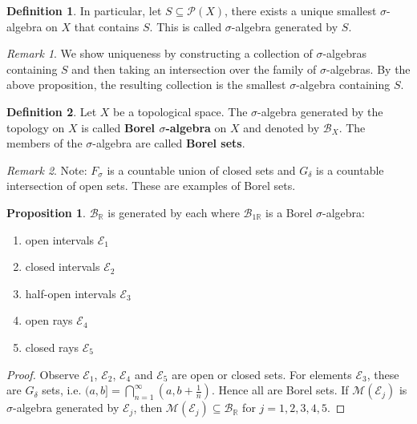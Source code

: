 \documentclass[11pt]{article}
\theoremstyle{definition}
\newtheorem{definition}{Definition}[section]
\newtheorem{proposition}{Proposition}[section]
\theoremstyle{remark}
\newtheorem{remark}{Remark}[section]
\begin{document}
\begin{definition}\label{def:sigma_algebra_generated}
In particular, let $S \subseteq \mathcal{P}(X)$, there exists a unique smallest $\sigma$-algebra on $X$ that contains $S$. This is called $\sigma$-algebra generated by $S$.
\end{definition}

\begin{remark}
We show uniqueness by constructing a collection of $\sigma$-algebras containing $S$ and then taking an intersection over the family of $\sigma$-algebras. By the above proposition, the resulting collection is the smallest $\sigma$-algebra containing $S$.
\end{remark}

\begin{definition}
Let $X$ be a topological space. The $\sigma$-algebra generated by the topology on $X$ is called \textbf{Borel $\sigma$-algebra} on $X$ and denoted by $\mathcal{B}_X$. The members of the $\sigma$-algebra are called \textbf{Borel sets}.
\end{definition}

\begin{remark}
Note: $F_\sigma$ is a countable union of closed sets and $G_\delta$ is a countable intersection of open sets. These are examples of Borel sets.
\end{remark}

\begin{proposition}\label{prop:borel_generation}
$\mathcal{B}_{\mathbb{R}}$ is generated by each where $\mathcal{B}_{1\mathbb{R}}$ is a Borel $\sigma$-algebra:

\begin{enumerate}
    \item[(a)] open intervals $\mathcal{E}_1$
    \item[(b)] closed intervals $\mathcal{E}_2$
    \item[(c)] half-open intervals $\mathcal{E}_3$
    \item[(d)] open rays $\mathcal{E}_4$
    \item[(e)] closed rays $\mathcal{E}_5$
\end{enumerate}
\end{proposition}

\begin{proof}
Observe $\mathcal{E}_1$, $\mathcal{E}_2$, $\mathcal{E}_4$ and $\mathcal{E}_5$ are open or closed sets. For elements $\mathcal{E}_3$, these are $G_\delta$ sets, i.e. $(a,b] = \bigcap_{n=1}^\infty (a,b+\frac{1}{n})$. Hence all are Borel sets. If $\mathcal{M}(\mathcal{E}_j)$ is $\sigma$-algebra generated by $\mathcal{E}_j$, then $\mathcal{M}(\mathcal{E}_j) \subseteq \mathcal{B}_{\mathbb{R}}$ for $j = 1, 2, 3, 4, 5$.
\end{proof}
\end{document}

